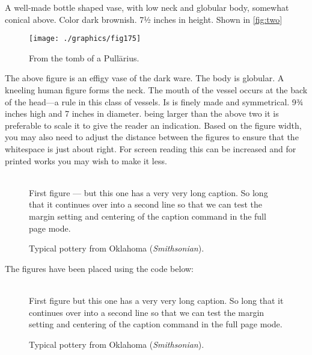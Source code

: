 A well-made bottle shaped vase, with low neck and globular body, somewhat conical above. Color dark brownish. 7½ inches in height. Shown in \ref{fig:two}


\begin{figure}
  \centering
  \texttt{[image: ./graphics/fig175]}
   \centerline{From the tomb of a Pull\= arius.}
  \label{fig:marginfig1}
\end{figure}

The above figure is an effigy vase of the dark ware. The body is globular. A kneeling human figure forms the neck. The mouth of the vessel occurs at the back of the head—a rule in this class of vessels. Is is finely made and symmetrical. 9¾ inches high and 7 inches in diameter. being larger than the above two it is preferable to scale it to give the reader an indication. Based on the figure width, you may also need to adjust the distance between the figures to ensure that the whitespace is just about right. For screen reading this can be increased and for printed works you may wish to make it less.


\begin{figure}%
    \captionsetup[figure]{margin=3pt}%
    \hspace{1cm}
     \\[-10pt]
    \caption{First figure --- but this one has a very very long caption.
     So long that it continues over into a second line so that we can 
     test the margin setting and centering of the caption command in the
     full page mode.}%
    \label{fig:Afirst}%
    \caption{Typical pottery from Oklahoma (\emph{Smithsonian}).}%
    \label{fig:Athird}%
\end{figure}


The figures have been placed using the code below:

\begin{teX}
\begin{figure}%
    \captionsetup[figure]{margin=3pt}%
    \hspace{1cm}
     \\[-10pt]
 \caption{First figure but this one has a very very long caption.
 So long that it continues over into a second line so that we can 
 test the margin setting and centering of the caption command in the
 full page mode.}%
 \label{fig:Afirst}%
 \caption{Typical pottery from Oklahoma (\emph{Smithsonian}).}%
 \label{fig:Athird}%
\end{figure}
\end{teX}

